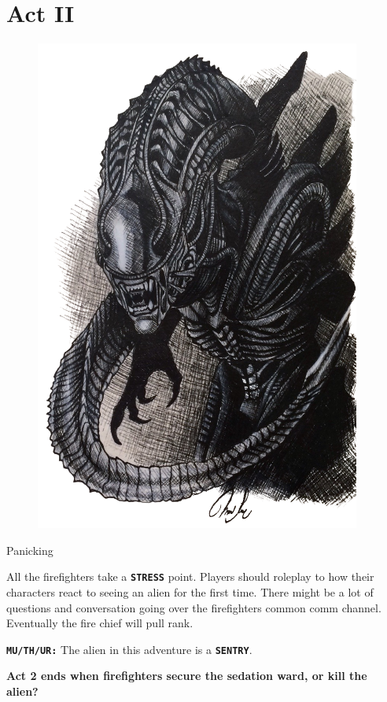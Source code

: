 \chapter{Act II}




\begin{figure}
   \centering
   \includegraphics[width=.45\textwidth]{img/bg/alien.png}
   \label{fig:refinery}
\end{figure}


\begin{rpg-commentbox}{Panicking}
   
   All the firefighters take a \texttt{\textbf{STRESS}} point. Players should roleplay to how their characters react to seeing an alien for the first time. There might be a lot of questions and conversation going over the firefighters common comm channel. Eventually the fire chief will pull rank.

   \texttt{\textbf{MU/TH/UR:}} The alien in this adventure is a \texttt{\textbf{SENTRY}}.

\end{rpg-commentbox}    


\begin{rpg-commentbox}{}
   \textbf{Act 2 ends when firefighters secure the sedation ward, or kill the alien?}
\end{rpg-commentbox}

\newsect




